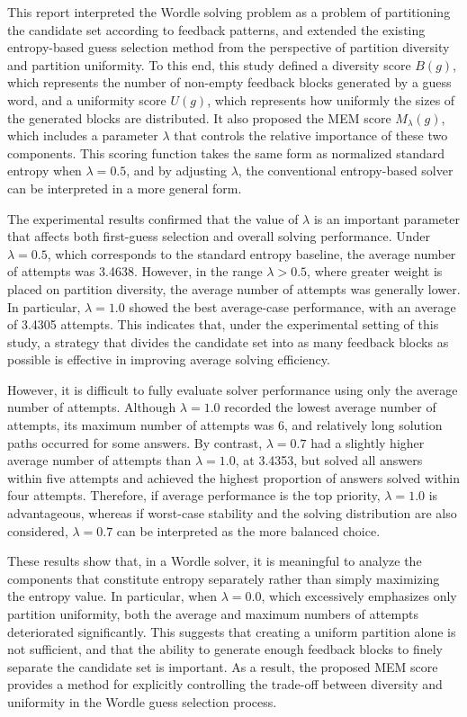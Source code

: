 \documentclass[11pt]{article}
\begin{document}
This report interpreted the Wordle solving problem as a problem of partitioning the candidate set according to feedback patterns, and extended the existing entropy-based guess selection method from the perspective of partition diversity and partition uniformity.
To this end, this study defined a diversity score $B(g)$, which represents the number of non-empty feedback blocks generated by a guess word, and a uniformity score $U(g)$, which represents how uniformly the sizes of the generated blocks are distributed.
It also proposed the MEM score $M_{\lambda}(g)$, which includes a parameter $\lambda$ that controls the relative importance of these two components.
This scoring function takes the same form as normalized standard entropy when $\lambda = 0.5$, and by adjusting $\lambda$, the conventional entropy-based solver can be interpreted in a more general form.

The experimental results confirmed that the value of $\lambda$ is an important parameter that affects both first-guess selection and overall solving performance.
Under $\lambda = 0.5$, which corresponds to the standard entropy baseline, the average number of attempts was 3.4638.
However, in the range $\lambda > 0.5$, where greater weight is placed on partition diversity, the average number of attempts was generally lower.
In particular, $\lambda = 1.0$ showed the best average-case performance, with an average of 3.4305 attempts.
This indicates that, under the experimental setting of this study, a strategy that divides the candidate set into as many feedback blocks as possible is effective in improving average solving efficiency.

However, it is difficult to fully evaluate solver performance using only the average number of attempts.
Although $\lambda = 1.0$ recorded the lowest average number of attempts, its maximum number of attempts was 6, and relatively long solution paths occurred for some answers.
By contrast, $\lambda = 0.7$ had a slightly higher average number of attempts than $\lambda = 1.0$, at 3.4353, but solved all answers within five attempts and achieved the highest proportion of answers solved within four attempts.
Therefore, if average performance is the top priority, $\lambda = 1.0$ is advantageous, whereas if worst-case stability and the solving distribution are also considered, $\lambda = 0.7$ can be interpreted as the more balanced choice.

These results show that, in a Wordle solver, it is meaningful to analyze the components that constitute entropy separately rather than simply maximizing the entropy value.
In particular, when $\lambda = 0.0$, which excessively emphasizes only partition uniformity, both the average and maximum numbers of attempts deteriorated significantly.
This suggests that creating a uniform partition alone is not sufficient, and that the ability to generate enough feedback blocks to finely separate the candidate set is important.
As a result, the proposed MEM score provides a method for explicitly controlling the trade-off between diversity and uniformity in the Wordle guess selection process.
\end{document}

